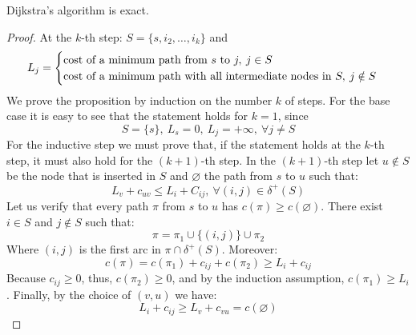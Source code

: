 \begin{proposition}
    Dijkstra's algorithm is exact. 
\end{proposition}
\begin{proof}
    At the $k$-th step: $S = \{s,i_2,\dots,i_k\}$ and 
    \[L_j=
    \begin{cases}
        \textnormal{cost of a minimum path from } s \textnormal{ to } j,\:j \in S \\ 
        \textnormal{cost of a minimum path with all intermediate nodes in } S, \: j \notin S
    \end{cases}
    \]
    We prove the proposition by induction on the number $k$ of steps. 
    For the base case it is easy to see that the statement holds for $k = 1$, since 
    \[S=\{s\},\: L_s=0,\: L_j= +\infty,\: \forall j \neq S \]
    For the inductive step we must prove that, if the statement holds at the $k$-th step, it must also hold for the $(k + 1)$-th step. 
    In the $(k + 1)$-th step let $u \notin S$be the node that is inserted in $S$ and $\varnothing$ the path from $s$ to $u$ such that:
    \[L_v + c_{uv} \leq L_i + C_{ij},\: \forall(i,j) \in \delta^{+}(S)\]
    Let us verify that every path $\pi$ from $s$ to $u$ has $c(\pi) \geq c(\varnothing)$. There exist $i \in S$ and $j \notin S$ such that: 
    \[\pi= \pi_1 \cup \{(i,j)\} \cup \pi_2\]
    Where $(i, j)$ is the first arc in $\pi \cap \delta^{+}(S)$. Moreover: 
    \[c(\pi) = c(\pi_1) + c_{ij} + c(\pi_2) \geq L_i + c_{ij}\]
    Because $c_{ij} \geq 0$, thus, $c(\pi_2) \geq 0$, and by the induction assumption, $c(\pi_1) \geq L_i$. Finally, by the choice of $(v,u)$ we have: 
    \[L_i + c_{ij} \geq L_v + c_{vu} = c(\varnothing)\]
\end{proof}

